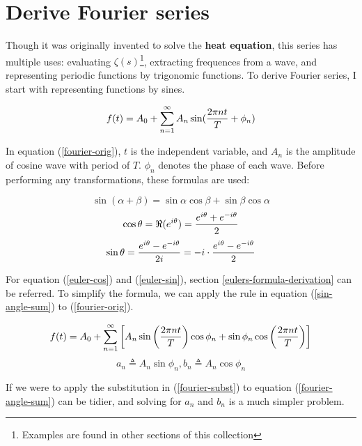 \section{Derive Fourier series}

Though it was originally invented to solve the \textbf{heat equation}, this
series has multiple uses: evaluating $\zeta(s)$\footnote{Examples are found in
other sections of this collection}, extracting frequences from a wave, and
representing periodic functions by trigonomic functions. To derive Fourier
series, I start with representing functions by sines.

\begin{equation}
	f(t)=A_0+\sum_{n=1}^\infty A_n\sin({2\pi nt\over T}+\phi_n)
	\label{fourier-orig}
\end{equation}

In equation (\ref{fourier-orig}), $t$ is the independent variable, and $A_n$ is
the amplitude of cosine wave with period of $T$. $\phi_n$ denotes the phase of
each wave. Before performing any transformations, these formulas are used:

\begin{equation}
	\sin(\alpha+\beta)=\sin\alpha\cos\beta+\sin\beta\cos\alpha
	\label{sin-angle-sum}
\end{equation}
\begin{equation}
	\cos\theta=\Re(e^{i\theta})={e^{i\theta}+e^{-i\theta}\over2}
	\label{euler-cos}
\end{equation}
\begin{equation}
	\sin\theta={e^{i\theta}-e^{-i\theta}\over2i}
	=-i\cdot{e^{i\theta}-e^{-i\theta}\over2}
	\label{euler-sin}
\end{equation}

For equation (\ref{euler-cos}) and (\ref{euler-sin}), section
\ref{eulers-formula-derivation} can be referred. To simplify the formula, we
can apply the rule in equation (\ref{sin-angle-sum}) to (\ref{fourier-orig}).

\begin{equation}
	f(t)=A_0+\sum_{n=1}^\infty\left[A_n\sin\left(2\pi nt\over T\right)
	\cos\phi_n+\sin\phi_n\cos\left(2\pi nt\over T\right)\right]
	\label{fourier-angle-sum}
\end{equation}
\begin{equation}
	a_n\triangleq A_n\sin\phi_n, b_n\triangleq A_n\cos\phi_n
	\label{fourier-subst}
\end{equation}

If we were to apply the substitution in (\ref{fourier-subst}) to equation
(\ref{fourier-angle-sum}) can be tidier, and solving for $a_n$ and $b_n$ is a
much simpler problem.

